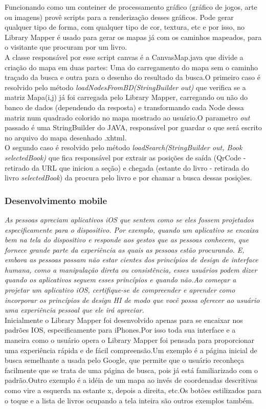 \documentclass[a4paper,10pt]{article}
\begin{document}
	Funcionando como um conteiner de processamento gráfico (gráfico de jogos, arte ou imagens) provê scripts para a renderização desses gráficos.
	Pode gerar qualquer tipo de forma, com qualquer tipo de cor, textura, etc e por isso, no Library Mapper é usado para gerar os mapas
	já com os caminhos mapeados, para o visitante que procuram por um livro.\\

	A classe responsável por esse script canvas é a CanvasMap.java que divide a criação do mapa em duas partes: Uma do carregamento do mapa
	 sem o caminho traçado da busca e outra para o desenho do resultado da busca.O primeiro caso é resolvido pelo método {\it loadNodesFromBD(StringBuilder out)} que verifica se
	a matriz Mapa(i,j) já foi carregada pelo Library Mapper, carregando ou não do banco de dados (dependendo da resposta) e transformando cada Node
	dessa matriz num quadrado colorido no mapa mostrado ao usuário.O parametro {\it out} passado é uma StringBuilder do JAVA, responsável por guardar o que será escrito no arquivo do mapa desenhado .xhtml.\\

	O segundo caso é resolvido pelo método {\it loadSearch(StringBuilder out, Book selectedBook)} que fica  responsável por extrair as posições de saída (QrCode - retirado da URL que iniciou a seção) e chegada (estante do livro - retirada do livro {\it selectedBook}) da procura pelo livro e por chamar a busca dessas posições.


      	\subsubsection{Desenvolvimento mobile}
	{\it As pessoas apreciam aplicativos iOS que sentem como se eles fossem projetados especificamente para o dispositivo. Por exemplo, quando um aplicativo se encaixa bem na tela do dispositivo e responde aos gestos que as pessoas conhecem, que fornece grande parte da experiência as quais as pessoas estão procurando. E, embora as pessoas possam não estar cientes dos princípios de design de interface humana, como a manipulação direta ou consistência, esses usuários podem dizer quando os aplicativos seguem esses princípios e quando não.Ao começar a projetar um aplicativo iOS, certifique-se de compreender e aprender como incorporar os princípios de design HI de modo que você possa oferecer ao usuário uma experiência pessoal que ele irá apreciar.}\cite{mobile}\\

	Inicialmente o Library Mapper foi desenvolvido apenas para se encaixar nos padrões IOS, especificamente para iPhones.Por isso toda sua interface e a maneira como o usuário opera o Library Mapper foi pensada para proporcionar uma experiência rápida e de fácil compreensão.Um exemplo é a página inicial de busca semelhante a usada pelo Google, que permite que o usuário reconheça facilmente que se trata de uma página de busca, pois já está familiarizado com o padrão.Outro exemplo é a idéia de um mapa ao invés de coordenadas descritivas como vire a esquerda na estante x, depois a direita, etc.Os botões estilizados para o toque e a lista de livros ocupando a tela inteira são outros exemplos também.
\end{document}

